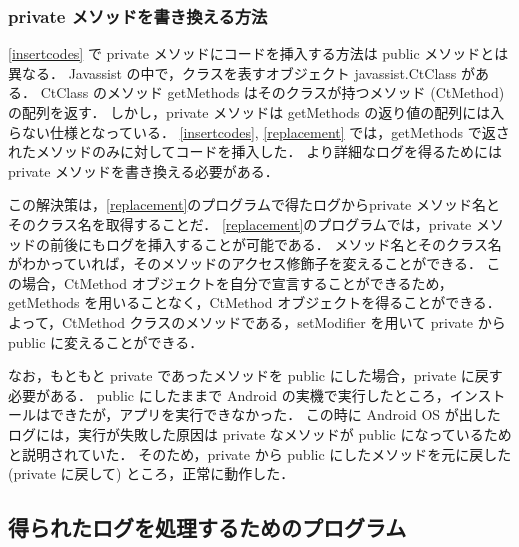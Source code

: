 \subsubsection{private メソッドを書き換える方法}
\label{private}
\ref{insertcodes} で 
private メソッドにコードを挿入する方法は public メソッドとは異なる．
Javassist の中で，クラスを表すオブジェクト javassist.CtClass がある．
CtClass のメソッド getMethods はそのクラスが持つメソッド (CtMethod) の配列を返す．
しかし，private メソッドは getMethods の返り値の配列には入らない仕様となっている．
\ref{insertcodes}, \ref{replacement} では，getMethods で返されたメソッドのみに対してコードを挿入した．
より詳細なログを得るためには private メソッドを書き換える必要がある．

この解決策は，\ref{replacement}のプログラムで得たログからprivate メソッド名とそのクラス名を取得することだ．
\ref{replacement}のプログラムでは，private メソッドの前後にもログを挿入することが可能である．
メソッド名とそのクラス名がわかっていれば，そのメソッドのアクセス修飾子を変えることができる．
この場合，CtMethod オブジェクトを自分で宣言することができるため，getMethods を用いることなく，CtMethod オブジェクトを得ることができる． 
よって，CtMethod クラスのメソッドである，setModifier を用いて private から public に変えることができる．

なお，もともと private であったメソッドを public にした場合，private に戻す必要がある．
public にしたままで Android の実機で実行したところ，インストールはできたが，アプリを実行できなかった．
この時に Android OS が出したログには，実行が失敗した原因は private なメソッドが public になっているためと説明されていた．
そのため，private から public にしたメソッドを元に戻した(private に戻して) ところ，正常に動作した．

\subsection{得られたログを処理するためのプログラム}
\label{splitscript}